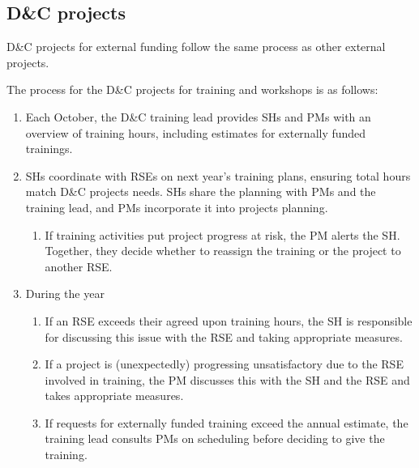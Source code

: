 \subsection{D\&C projects}
D\&C projects for external funding follow the same process as other external projects.

The process for the D\&C projects for training and workshops is as follows:
\begin{enumerate}[label=\arabic*),ref=\arabic*]
\item Each October, the D\&C training lead provides SHs and PMs with an overview of training hours, including estimates for externally funded trainings.
\item SHs coordinate with RSEs on next year's training plans, ensuring total hours match D\&C projects needs. SHs share the planning 
with PMs and the training lead, and PMs incorporate it into projects planning.
\begin{enumerate}[label=\alph*.,ref=\alph*]
\item If training activities put project progress at risk, the PM alerts the SH. Together, they decide whether to reassign the training or the project to another RSE.
\end{enumerate}
\item During the year
\begin{enumerate}[label=\alph*.,ref=\alph*]
\item If an RSE exceeds their agreed upon training hours, the SH is responsible for discussing this
issue with the RSE and taking appropriate measures.
\item If a project is (unexpectedly) progressing unsatisfactory due to the RSE involved in training,
the PM discusses this with the SH and the RSE and takes appropriate measures.
\item If requests for externally funded training exceed the annual estimate, the training lead consults PMs on scheduling before deciding to give the training.
\end{enumerate}
\end{enumerate}


